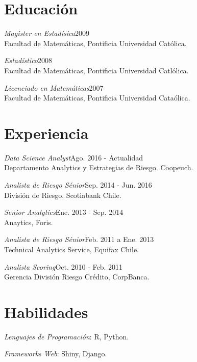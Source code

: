 \documentclass[margin]{res}
\begin{document}
\begin{resume}

\section{Educación}

    {\sl Magister en Estadísica}\hfill 2009\\
    Facultad de Matemáticas, Pontificia Universidad Católica.

    {\sl Estadístico}\hfill 2008\\
    Facultad de Matemáticas, Pontificia Universidad Catlólica.

    {\sl Licenciado en Matemáticas}\hfill 2007\\
    Facultad de Matemáticas, Pontificia Universidad Cataólica.

\vspace{1cm}

\section{Experiencia}

    {\sl Data Science Analyst}\hfill Ago. 2016 - Actualidad\\
        Departamento Analytics y Estrategias de Riesgo. Coopeuch.

    {\sl Analista de Riesgo Sénior}\hfill Sep. 2014 - Jun. 2016\\
        División de Riesgo, Scotiabank Chile.

    {\sl Senior Analytics}\hfill Ene. 2013 - Sep. 2014\\
    Anaytics, Foris.

    {\sl Analista de Riesgo Sénior}\hfill Feb. 2011 a Ene. 2013\\
    Technical Analytics Service, Equifax Chile.

    {\sl Analista Scoring}\hfill Oct. 2010 - Feb. 2011\\
    Gerencia División Riesgo Crédito, CorpBanca.

\vspace{1cm}

\section{Habilidades}

    {\sl Lenguajes de Programación}: R, Python.

    {\sl Frameworks Web}: Shiny, Django.


\end{resume}
\end{document}
